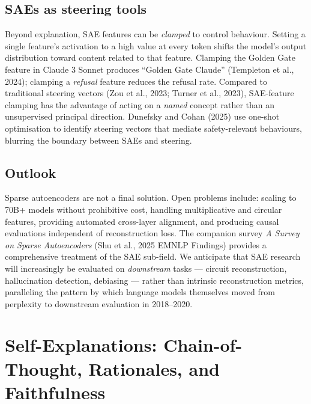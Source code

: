 \subsection{SAEs as steering tools}\label{saes-as-steering-tools}

Beyond explanation, SAE features can be \emph{clamped} to control behaviour. Setting a single feature's activation to a high value at every token shifts the model's output distribution toward content related to that feature. Clamping the Golden Gate feature in Claude 3 Sonnet produces ``Golden Gate Claude'' (Templeton et al., 2024); clamping a \emph{refusal} feature reduces the refusal rate. Compared to traditional steering vectors (Zou et al., 2023; Turner et al., 2023), SAE-feature clamping has the advantage of acting on a \emph{named} concept rather than an unsupervised principal direction. Dunefsky and Cohan (2025) use one-shot optimisation to identify steering vectors that mediate safety-relevant behaviours, blurring the boundary between SAEs and steering.

\subsection{Outlook}\label{outlook}

Sparse autoencoders are not a final solution. Open problems include: scaling to 70B+ models without prohibitive cost, handling multiplicative and circular features, providing automated cross-layer alignment, and producing causal evaluations independent of reconstruction loss. The companion survey \emph{A Survey on Sparse Autoencoders} (Shu et al., 2025 EMNLP Findings) provides a comprehensive treatment of the SAE sub-field. We anticipate that SAE research will increasingly be evaluated on \emph{downstream} tasks --- circuit reconstruction, hallucination detection, debiasing --- rather than intrinsic reconstruction metrics, paralleling the pattern by which language models themselves moved from perplexity to downstream evaluation in 2018--2020.

\section{Self-Explanations: Chain-of-Thought, Rationales, and Faithfulness}\label{self-explanations-chain-of-thought-rationales-and-faithfulness}

